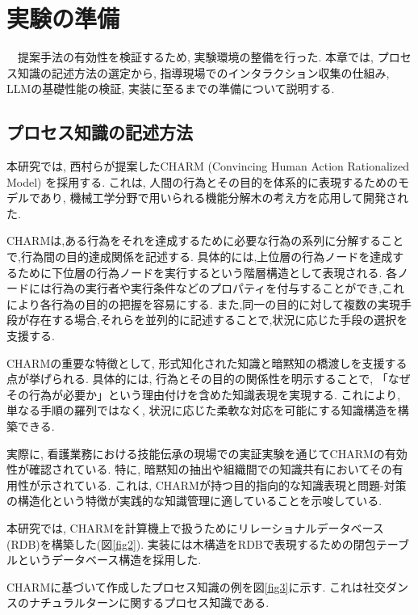 \chapter{実験の準備}
　提案手法の有効性を検証するため, 実験環境の整備を行った. 本章では, プロセス知識の記述方法の選定から, 指導現場でのインタラクション収集の仕組み, LLMの基礎性能の検証, 実装に至るまでの準備について説明する. 

\section{プロセス知識の記述方法}
本研究では, 西村らが提案したCHARM (Convincing Human Action Rationalized Model) \cite{Nishimura2008, Nishimura2015}を採用する. これは, 人間の行為とその目的を体系的に表現するためのモデルであり, 機械工学分野で用いられる機能分解木の考え方を応用して開発された.

CHARMは,ある行為をそれを達成するために必要な行為の系列に分解することで,行為間の目的達成関係を記述する. 具体的には,上位層の行為ノードを達成するために下位層の行為ノードを実行するという階層構造として表現される. 各ノードには行為の実行者や実行条件などのプロパティを付与することができ,これにより各行為の目的の把握を容易にする. また,同一の目的に対して複数の実現手段が存在する場合,それらを並列的に記述することで,状況に応じた手段の選択を支援する. 

CHARMの重要な特徴として, 形式知化された知識と暗黙知の橋渡しを支援する点が挙げられる. 具体的には, 行為とその目的の関係性を明示することで, 「なぜその行為が必要か」という理由付けを含めた知識表現を実現する. これにより, 単なる手順の羅列ではなく, 状況に応じた柔軟な対応を可能にする知識構造を構築できる.

実際に, 看護業務における技能伝承の現場での実証実験を通じてCHARMの有効性が確認されている. 特に, 暗黙知の抽出や組織間での知識共有においてその有用性が示されている. これは, CHARMが持つ目的指向的な知識表現と問題-対策の構造化という特徴が実践的な知識管理に適していることを示唆している.

本研究では, CHARMを計算機上で扱うためにリレーショナルデータベース(RDB)を構築した(図\ref{fig2}). 実装には木構造をRDBで表現するための閉包テーブルというデータベース構造を採用した.

CHARMに基づいて作成したプロセス知識の例を図\ref{fig3}に示す. これは社交ダンスのナチュラルターンに関するプロセス知識である.


